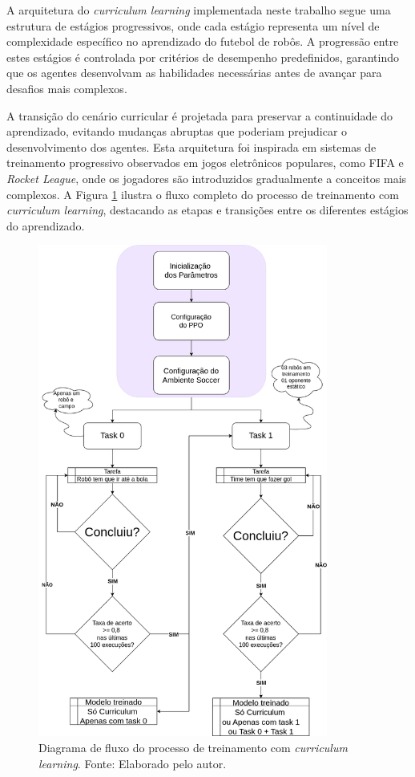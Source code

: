 A arquitetura do \textit{curriculum learning} implementada neste trabalho segue uma estrutura de estágios progressivos, onde cada estágio representa um nível de complexidade específico no aprendizado do futebol de robôs. A progressão entre estes estágios é controlada por critérios de desempenho predefinidos, garantindo que os agentes desenvolvam as habilidades necessárias antes de avançar para desafios mais complexos.

A transição do cenário curricular é projetada para preservar a continuidade do aprendizado, evitando mudanças abruptas que poderiam prejudicar o desenvolvimento dos agentes. Esta arquitetura foi inspirada em sistemas de treinamento progressivo observados em jogos eletrônicos populares, como FIFA e \textit{Rocket League}, onde os jogadores são introduzidos gradualmente a conceitos mais complexos. A Figura \ref{fig:diagrama_curriculum} ilustra o fluxo completo do processo de treinamento com \textit{curriculum learning}, destacando as etapas e transições entre os diferentes estágios do aprendizado.

\begin{figure}[H]
    \centering
    \includegraphics[width=0.85\textwidth]{fig/fluxograma_treino_curriculum.png}
    \caption{Diagrama de fluxo do processo de treinamento com \textit{curriculum learning}. Fonte: Elaborado pelo autor.}
    \label{fig:diagrama_curriculum}
\end{figure}

